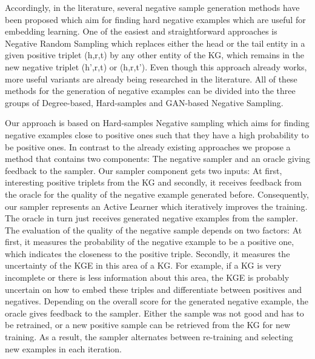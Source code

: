 Accordingly, in the literature, several negative sample generation methods have been proposed which aim for finding hard negative examples which are useful for embedding learning.
One of the easiest and straightforward approaches is Negative Random Sampling which replaces either the head or the tail entity in a given positive triplet (h,r,t) by any other entity of the \ac{KG}, which remains in the new negative triplet (h’,r,t) or (h,r,t’). 
Even though this approach already works, more useful variants are already being researched in the literature.
All of these methods for the generation of negative examples can be divided into the three groups of Degree-based, Hard-samples and
\ac{GAN}-based Negative Sampling.

Our approach is based on Hard-samples Negative sampling which aims for finding negative examples close to positive ones such that they have a high probability to be positive ones.
In contrast to the already existing approaches we propose a method that contains two components:
The negative sampler and an oracle giving feedback to the sampler.
Our sampler component gets two inputs:
At first, interesting positive triplets from the \ac{KG} and secondly, it receives feedback from the oracle for the quality of the negative example generated before.
Consequently, our sampler represents an Active Learner which iteratively improves the training.
The oracle in turn just receives generated negative examples from the sampler. 
The evaluation of the quality of the negative sample depends on two factors:
At first, it measures the probability of the negative example to be a positive one, 
which indicates the closeness to the positive triple. 
Secondly, it measures the uncertainty of the \ac{KGE} in this area of a \ac{KG}. 
For example, if a \ac{KG} is very incomplete or there is less information about this area, the \ac{KGE} is probably uncertain on how to embed these triples and differentiate between positives and negatives.
Depending on the overall score for the generated negative example, the oracle gives feedback to the sampler.
Either the sample was not good and has to be retrained, or a new positive sample can be retrieved from the \ac{KG} for new training.
As a result, the sampler alternates between re-training and selecting new examples in each iteration.


